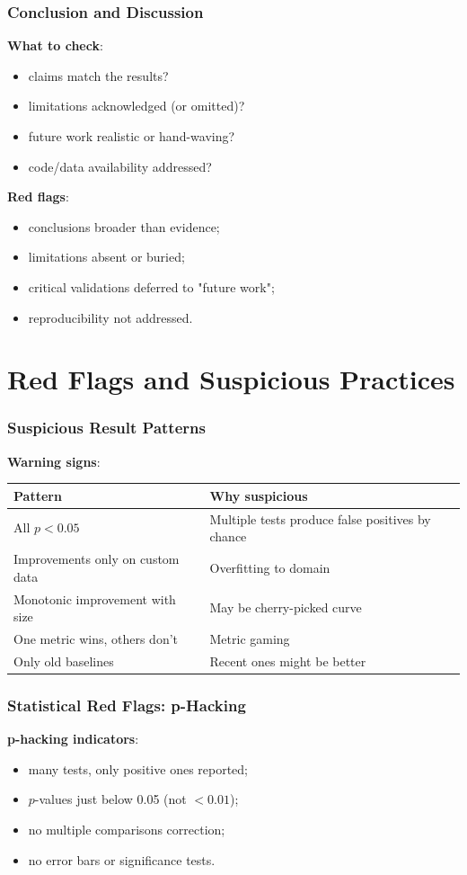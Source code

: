 \documentclass[]{beamer}
\begin{document}
\begin{frame}[fragile]
\frametitle{Conclusion and Discussion}
\textbf{What to check}:
\begin{itemize}
  \item claims match the results?
  \item limitations acknowledged (or omitted)?
  \item future work realistic or hand-waving?
  \item code/data availability addressed?
\end{itemize}

\textbf{Red flags}:
\begin{itemize}
  \item conclusions broader than evidence;
  \item limitations absent or buried;
  \item critical validations deferred to "future work";
  \item reproducibility not addressed.
\end{itemize}

\end{frame}

\section{Red Flags and Suspicious Practices}

\begin{frame}[fragile]
\frametitle{Suspicious Result Patterns}
\textbf{Warning signs}:

{\tiny
\begin{tabular}{p{3.8cm} p{6.2cm}}
\toprule
\textbf{Pattern} & \textbf{Why suspicious} \\
\midrule
All $p < 0.05$ & Multiple tests produce false positives by chance \\
Improvements only on custom data & Overfitting to domain \\
Monotonic improvement with size & May be cherry-picked curve \\
One metric wins, others don't & Metric gaming \\
Only old baselines & Recent ones might be better \\
\bottomrule
\end{tabular}
}

\end{frame}

\begin{frame}[fragile]
\frametitle{Statistical Red Flags: p-Hacking}
\textbf{p-hacking indicators}:
\begin{itemize}
  \item many tests, only positive ones reported;
  \item $p$-values just below 0.05 (not $< 0.01$);
  \item no multiple comparisons correction;
  \item no error bars or significance tests.
\end{itemize}

\end{frame}
\end{document}
